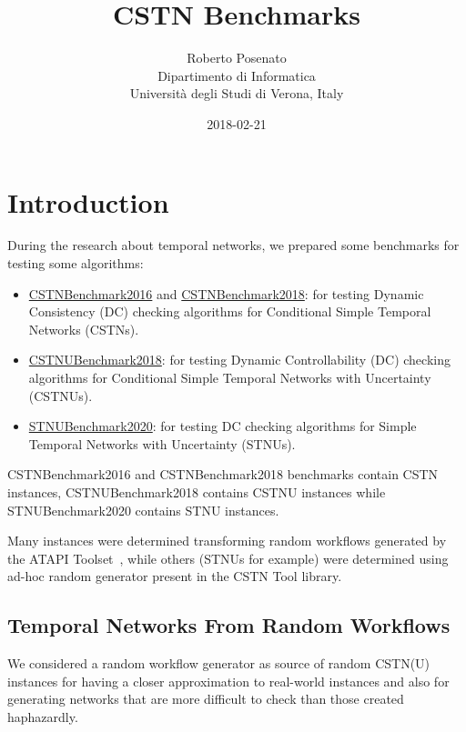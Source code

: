 \documentclass[a4paper,11pt]{article}
\begin{document}
\title{CSTN Benchmarks}
\author{Roberto Posenato\\
	Dipartimento di Informatica\\
	Università degli Studi di Verona, Italy}
\date{2018-02-21}

\ifpdf
\maketitle
\fi 

\section{Introduction}

During the research about temporal networks, we prepared some benchmarks for testing some algorithms:
\begin{itemize}
\item  \href{http://profs.scienze.univr.it/~posenato/software/benchmarks/CSTNBenchmark2016.tgz}{CSTNBenchmark2016} and \href{http://profs.scienze.univr.it/~posenato/software/benchmarks/CSTNBenchmark2018.tgz}{CSTNBenchmark2018}: for testing Dynamic Consistency (DC) checking algorithms for Conditional Simple Temporal Networks (CSTNs).

\item  \href{http://profs.scienze.univr.it/~posenato/software/benchmarks/CSTNUBenchmark2018.tgz}{CSTNUBenchmark2018}: for testing Dynamic Controllability (DC) checking algorithms for Conditional Simple Temporal Networks with Uncertainty (CSTNUs).

\item \href{https://profs.scienze.univr.it/~posenato/software/benchmarks/STNUBenchmark2020.tgz}{STNUBenchmark2020}: for testing DC checking algorithms for Simple Temporal Networks with Uncertainty (STNUs).
\end{itemize} 

CSTNBenchmark2016 and CSTNBenchmark2018 benchmarks contain CSTN instances, CSTNUBenchmark2018 contains CSTNU instances while STNUBenchmark2020 contains STNU instances.

Many instances were determined transforming random workflows generated by the ATAPI Toolset~\cite{Lanz14b}, while others (STNUs for example) were determined using ad-hoc random generator present in the CSTN Tool library.


\subsection{Temporal Networks From Random Workflows}
We considered a random workflow generator as source of random CSTN(U) instances for having a closer approximation to real-world instances and also for generating networks that are more difficult to check than those created haphazardly.
\end{document}
